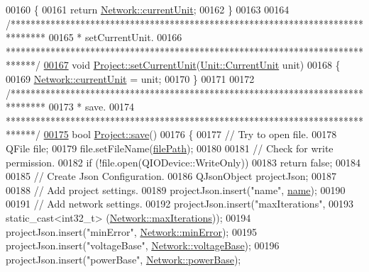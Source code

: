 \begin{DoxyCode}
00160 \{
00161   \textcolor{keywordflow}{return} \hyperlink{group___graphics_gac6a26db5fef2b1dd2a00faf6340d1702}{Network::currentUnit};
00162 \}
00163 
00164 \textcolor{comment}{/*******************************************************************************}
00165 \textcolor{comment}{ * setCurrentUnit.}
00166 \textcolor{comment}{ ******************************************************************************/}
\hypertarget{project_8cpp_source_l00167}{}\hyperlink{class_project_a64d9800bc3acafcfa4d3f45ee5aacc6d}{00167} \textcolor{keywordtype}{void} \hyperlink{class_project_a64d9800bc3acafcfa4d3f45ee5aacc6d}{Project::setCurrentUnit}(\hyperlink{class_unit_a0794cf6c9682f48296dd4a5315389787}{Unit::CurrentUnit} unit)
00168 \{
00169   \hyperlink{group___graphics_gac6a26db5fef2b1dd2a00faf6340d1702}{Network::currentUnit} = unit;
00170 \}
00171 
00172 \textcolor{comment}{/*******************************************************************************}
00173 \textcolor{comment}{ * save.}
00174 \textcolor{comment}{ ******************************************************************************/}
\hypertarget{project_8cpp_source_l00175}{}\hyperlink{class_project_a596a875bc5be73bc5b1b71b6448c1e07}{00175} \textcolor{keywordtype}{bool} \hyperlink{class_project_a596a875bc5be73bc5b1b71b6448c1e07}{Project::save}()
00176 \{
00177   \textcolor{comment}{// Try to open file.}
00178   QFile file;
00179   file.setFileName(\hyperlink{class_project_a79f30adcefd0b72bd4ac7db724bc9531}{filePath});
00180 
00181   \textcolor{comment}{// Check for write permission.}
00182   \textcolor{keywordflow}{if} (!file.open(QIODevice::WriteOnly))
00183     \textcolor{keywordflow}{return} \textcolor{keyword}{false};
00184 
00185   \textcolor{comment}{// Create Json Configuration.}
00186   QJsonObject projectJson;
00187 
00188   \textcolor{comment}{// Add project settings.}
00189   projectJson.insert(\textcolor{stringliteral}{"name"}, \hyperlink{class_project_a82dd2d1bc38f9fd08c9a811fcaa76b38}{name});
00190 
00191   \textcolor{comment}{// Add network settings.}
00192   projectJson.insert(\textcolor{stringliteral}{"maxIterations"},
00193                      static\_cast<int32\_t> (\hyperlink{group___graphics_ga318dee060bc577eacd67d332efbbe1b2}{Network::maxIterations}));
00194   projectJson.insert(\textcolor{stringliteral}{"minError"}, \hyperlink{group___graphics_gabcdc973129d3dda7572b7a1c388da1b5}{Network::minError});
00195   projectJson.insert(\textcolor{stringliteral}{"voltageBase"}, \hyperlink{group___graphics_ga7c1e79d9ac69df9a69f24eaf092fd5e5}{Network::voltageBase});
00196   projectJson.insert(\textcolor{stringliteral}{"powerBase"}, \hyperlink{group___graphics_ga74bb7aa495d422f1f092acdf958df989}{Network::powerBase});

\end{DoxyCode}
